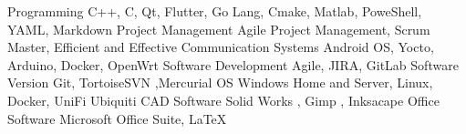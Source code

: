 \begin{cvskills}
  \cvskill
    {Programming} %
    {C++, C, Qt, Flutter, Go Lang, Cmake, Matlab, PoweShell, YAML, Markdown} %
  \cvskill
    {Project Management} %
    {Agile Project Management, Scrum Master, Efficient and Effective Communication} 
  \cvskill
    {Systems} %
    {Android OS, Yocto, Arduino, Docker, OpenWrt} %
  \cvskill
    {Software Development} %
    {Agile, JIRA, GitLab} %
  \cvskill
    {Software Version} %
    {Git, TortoiseSVN ,Mercurial} %
  \cvskill
    {OS} %
    {Windows Home and Server, Linux, Docker, UniFi Ubiquiti } %
  \cvskill
    {CAD Software} %
    {Solid Works , Gimp , Inksacape} %
  \cvskill
    {Office Software} %
    {Microsoft Office Suite, LaTeX} %
\end{cvskills}
